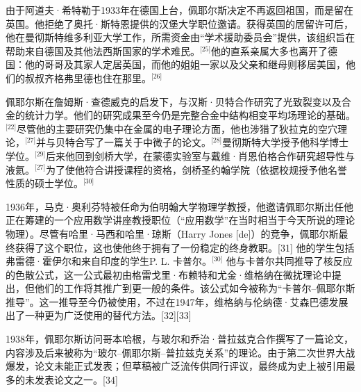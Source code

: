 由于阿道夫·希特勒于1933年在德国上台，佩耶尔斯决定不再返回祖国，而是留在英国。他拒绝了奥托·斯特恩提供的汉堡大学职位邀请。获得英国的居留许可后，他在曼彻斯特维多利亚大学工作，所需资金由“学术援助委员会”提供，该组织旨在帮助来自德国及其他法西斯国家的学术难民。\(^\text{[25]}\)他的直系亲属大多也离开了德国：他的哥哥及其家人定居英国，而他的姐姐一家以及父亲和继母则移居美国，他们的叔叔齐格弗里德也住在那里。\(^\text{[26]}\)

佩耶尔斯在詹姆斯·查德威克的启发下，与汉斯·贝特合作研究了光致裂变以及合金的统计力学。他们的研究成果至今仍是完整合金中结构相变平均场理论的基础。\(^\text{[22]}\)尽管他的主要研究仍集中在金属的电子理论方面，他也涉猎了狄拉克的空穴理论，\(^\text{[27]}\)并与贝特合写了一篇关于中微子的论文。\(^\text{[28]}\)曼彻斯特大学授予他科学博士学位。\(^\text{[29]}\)后来他回到剑桥大学，在蒙德实验室与戴维·肖恩伯格合作研究超导性与液氦。\(^\text{[27]}\)为了使他符合讲授课程的资格，剑桥圣约翰学院（依据校规授予他名誉性质的硕士学位。\(^\text{[30]}\)

1936年，马克·奥利芬特被任命为伯明翰大学物理学教授，他邀请佩耶尔斯出任他正在筹建的一个应用数学讲座教授职位（“应用数学”在当时相当于今天所说的理论物理）。尽管有哈里·马西和哈里·琼斯（Harry Jones [de]）的竞争，佩耶尔斯最终获得了这个职位，这也使他终于拥有了一份稳定的终身教职。[31] 他的学生包括弗雷德·霍伊尔和来自印度的学生P. L. 卡普尔。\(^\text{[30]}\)
他与卡普尔共同推导了核反应的色散公式，这一公式最初由格雷戈里·布赖特和尤金·维格纳在微扰理论中提出，但他们的工作将其推广到更一般的条件。该公式如今被称为“卡普尔–佩耶尔斯推导”。这一推导至今仍被使用，不过在1947年，维格纳与伦纳德·艾森巴德发展出了一种更为广泛使用的替代方法。[32][33]

1938年，佩耶尔斯访问哥本哈根，与玻尔和乔治·普拉兹克合作撰写了一篇论文，内容涉及后来被称为“玻尔–佩耶尔斯–普拉兹克关系”的理论。由于第二次世界大战爆发，论文未能正式发表；但草稿被广泛流传供同行评议，最终成为史上被引用最多的未发表论文之一。[34]
